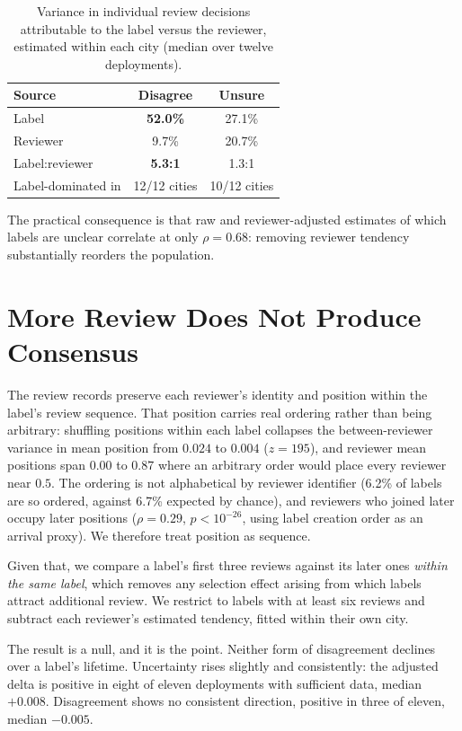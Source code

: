 \documentclass[sigconf]{acmart}
\begin{document}
\begin{table}[t]
\caption{Variance in individual review decisions attributable to the label
versus the reviewer, estimated within each city (median over twelve
deployments).}
\label{tab:variance}
\begin{tabular}{lcc}
\toprule
\textbf{Source} & \textbf{Disagree} & \textbf{Unsure} \\
\midrule
Label            & \textbf{52.0\%} & 27.1\% \\
Reviewer         & 9.7\%           & 20.7\% \\
Label:reviewer   & \textbf{5.3:1}  & 1.3:1 \\
Label-dominated in & 12/12 cities  & 10/12 cities \\
\bottomrule
\end{tabular}
\end{table}

The practical consequence is that raw and reviewer-adjusted estimates of which
labels are unclear correlate at only $\rho = 0.68$: removing reviewer tendency
substantially reorders the population.

\section{More Review Does Not Produce Consensus}
\label{sec:resolve}

The review records preserve each reviewer's identity and position within the
label's review sequence. That position carries real ordering rather than being
arbitrary: shuffling positions within each label collapses the between-reviewer
variance in mean position from $0.024$ to $0.004$ ($z=195$), and reviewer mean
positions span $0.00$ to $0.87$ where an arbitrary order would place every
reviewer near $0.5$. The ordering is not alphabetical by reviewer identifier
(6.2\% of labels are so ordered, against 6.7\% expected by chance), and
reviewers who joined later occupy later positions ($\rho = 0.29$,
$p < 10^{-26}$, using label creation order as an arrival proxy). We therefore
treat position as sequence.

Given that, we compare a label's first three reviews against its later ones
\emph{within the same label}, which removes any selection effect arising from
which labels attract additional review. We restrict to labels with at least six
reviews and subtract each reviewer's estimated tendency, fitted within their own
city.

The result is a null, and it is the point. Neither form of disagreement declines
over a label's lifetime. Uncertainty rises slightly and consistently: the
adjusted delta is positive in eight of eleven deployments with sufficient data,
median $+0.008$. Disagreement shows no consistent direction, positive in three
of eleven, median $-0.005$.
\end{document}
